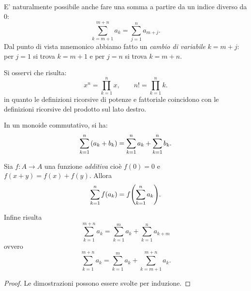 E' naturalmente possibile anche fare una somma a partire da un indice 
diverso da $0$:
\[
  \sum_{k=m+1}^{m+n} a_k = \sum_{j=1}^{n} a_{m+j}.
\]
Dal punto di vista mnemonico abbiamo fatto 
un \emph{cambio di variabile} $k=m+j$:
per $j=1$ si trova $k=m+1$ e per $j=n$ si trova $k=m+n$.

Si osservi che risulta:
\[
  x^n = \prod_{k=1}^n x, \qquad 
  n! = \prod_{k=1}^n k.  
\]
in quanto le definizioni ricorsive di potenze e fattoriale
coincidono con le definizioni ricorsive del prodotto sul lato destro.

\begin{theorem}
In un monoide commutativo, si ha:
  \[
  \sum_{k=1}^n  {\left( a_k + b_k \right)} 
  = \sum_{k=1}^n a_k + \sum_{k=1}^n b_k.
  \]

Sia $f\colon A\to A$ una funzione \emph{additiva}
cioè $f(0) = 0$ e $f(x+y)=f(x)+f(y)$.
Allora 
  \[
    \sum_{k=1}^n  f(a_k) = f{\left( \sum_{k=1}^n a_k \right)}.
  \]

Infine risulta 
  \[
  \sum_{k=1}^{m+n} a_k = \sum_{k=1}^m a_k + \sum_{k=1}^n a_{k+m}
  \]
ovvero 
  \[
  \sum_{k=1}^{m+n} a_k = \sum_{k=1}^m a_k + \sum_{k=m+1}^{m+n} a_k.  
  \]
\end{theorem}
\begin{proof}
  Le dimostrazioni possono essere svolte 
  per induzione.
\end{proof}

